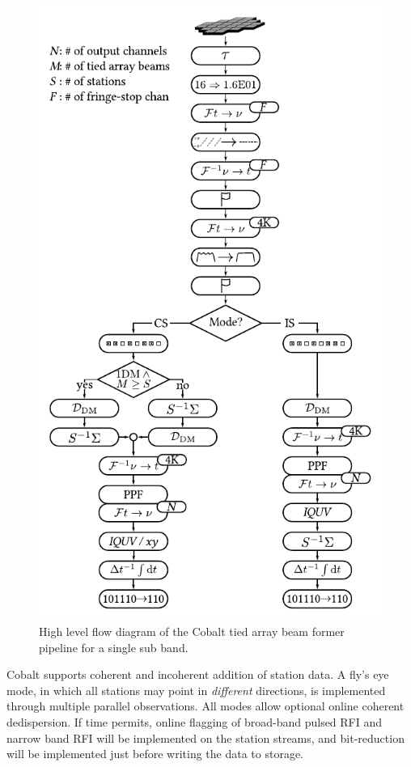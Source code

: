 \documentclass[a4paper,twoside]{article}
\newcommand{\cobalt}{Cobalt\xspace}
\begin{document}
\begin{figure}
\begin{center}
\includegraphics[height=0.9\textheight]{cobalt-beam-former-pipeline-bw.pdf}
\end{center}
\caption{High level flow diagram of the \cobalt tied array beam former
  pipeline for a single sub band.}
\label{fig:pipeline-overview}
\end{figure}


\cobalt supports coherent and incoherent addition of station data. A
fly's eye mode, in which all stations may point in \emph{different}
directions, is implemented through multiple parallel observations. All
modes allow optional online coherent dedispersion. If time permits,
online flagging of broad-band pulsed RFI and narrow band RFI will be
implemented on the station streams, and bit-reduction will be
implemented just before writing the data to storage.
\end{document}
